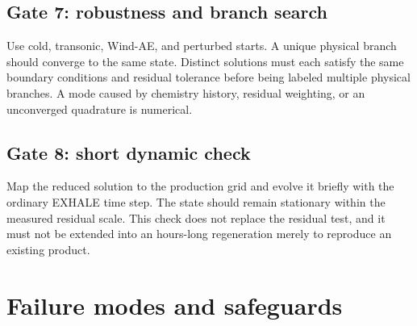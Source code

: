 \documentclass[english,a4paper]{my_memo}
\begin{document}
\subsection{Gate 7: robustness and branch search}

Use cold, transonic, Wind-AE, and perturbed starts.  A unique physical branch
should converge to the same state.  Distinct solutions must each satisfy the
same boundary conditions and residual tolerance before being labeled multiple
physical branches.  A mode caused by chemistry history, residual weighting, or
an unconverged quadrature is numerical.

\subsection{Gate 8: short dynamic check}

Map the reduced solution to the production grid and evolve it briefly with the
ordinary EXHALE time step.  The state should remain stationary within the
measured residual scale.  This check does not replace the residual test, and it
must not be extended into an hours-long regeneration merely to reproduce an
existing product.

\section{Failure modes and safeguards}\label{sec:failures}
\end{document}
